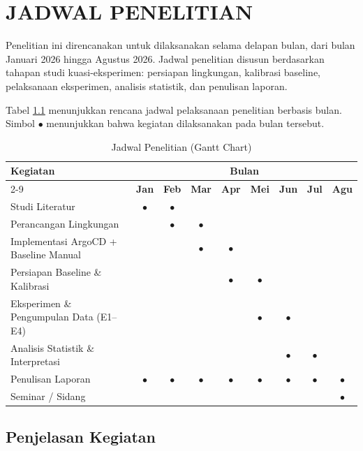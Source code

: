 \chapter{JADWAL PENELITIAN}

Penelitian ini direncanakan untuk dilaksanakan selama delapan bulan, dari bulan Januari 2026 hingga Agustus 2026. Jadwal penelitian disusun berdasarkan tahapan studi kuasi-eksperimen: persiapan lingkungan, kalibrasi baseline, pelaksanaan eksperimen, analisis statistik, dan penulisan laporan.

Tabel \ref{tab:jadwal} menunjukkan rencana jadwal pelaksanaan penelitian berbasis bulan. Simbol $\bullet$ menunjukkan bahwa kegiatan dilaksanakan pada bulan tersebut.

\begin{table}[H]
  \centering
  \caption{Jadwal Penelitian (Gantt Chart)}
  \label{tab:jadwal}
  \begin{tabular}{|l|c|c|c|c|c|c|c|c|}
    \hline
    \multirow{2}{*}{\textbf{Kegiatan}} & \multicolumn{8}{c|}{\textbf{Bulan}} \\
    \cline{2-9}
     & \textbf{Jan} & \textbf{Feb} & \textbf{Mar} & \textbf{Apr} & \textbf{Mei} & \textbf{Jun} & \textbf{Jul} & \textbf{Agu} \\
    \hline
    Studi Literatur & $\bullet$ & $\bullet$ & & & & & & \\
    \hline
    Perancangan Lingkungan & & $\bullet$ & $\bullet$ & & & & & \\
    \hline
    Implementasi ArgoCD + Baseline Manual & & & $\bullet$ & $\bullet$ & & & & \\
    \hline
    Persiapan Baseline \& Kalibrasi & & & & $\bullet$ & $\bullet$ & & & \\
    \hline
    Eksperimen \& Pengumpulan Data (E1--E4) & & & & & $\bullet$ & $\bullet$ & & \\
    \hline
    Analisis Statistik \& Interpretasi & & & & & & $\bullet$ & $\bullet$ & \\
    \hline
    Penulisan Laporan & $\bullet$ & $\bullet$ & $\bullet$ & $\bullet$ & $\bullet$ & $\bullet$ & $\bullet$ & $\bullet$ \\
    \hline
    Seminar / Sidang & & & & & & & & $\bullet$ \\
    \hline
  \end{tabular}
\end{table}

\section{Penjelasan Kegiatan}

